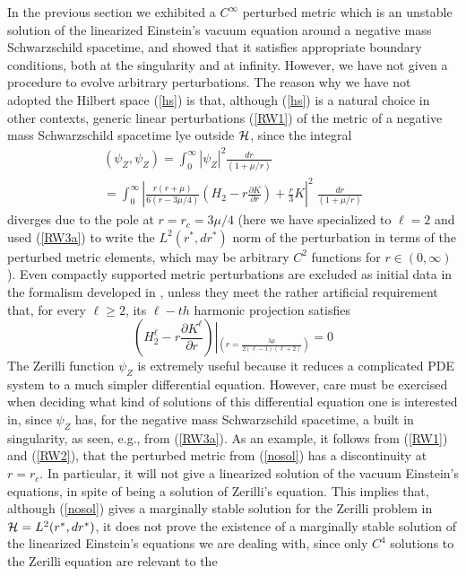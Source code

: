 \documentclass[12pt,aps,floats,showpacs,amssymb,tightenlines]{revtex4}
\newcommand{\m}{\mu}
\newcommand{\s}{ Schwarzschild }
\begin{document}
In the previous section we exhibited a $C^{\infty}$ perturbed metric
which is an unstable solution of the linearized Einstein's vacuum
equation around a negative mass \s spacetime, and showed that it
satisfies appropriate boundary conditions, both at the singularity
and at infinity. However, we have not  given a procedure to evolve
arbitrary perturbations. The reason why we have not adopted the
Hilbert space (\ref{hs}) is that, although (\ref{hs}) is a
natural choice in other contexts, generic linear perturbations
(\ref{RW1}) of the metric of a negative mass \s spacetime lye
outside ${\cal H}$, since the integral
\begin{multline}
(\psi_Z,\psi_Z) = \int _{0}^{\infty} |\psi_Z|^2 \frac{dr}{(1+\m/r)}
\\ = \int _{0}^{\infty} \left| \frac {r (r+\m)}{ 6  ( r - 3\m /4 ) }
\left(H_2
 - r  \frac {\partial K}{\partial r}
\right)
    +\frac{r}{3} K \right|^2 \; \frac{dr}{(1+\m/r)}
\end{multline}
diverges due to the pole at $r= r_c = 3 \mu /4$ (here we have
specialized to $\ell=2$ and used (\ref{RW3a}) to write the
$L^2(r^*,dr^*)$ norm of the perturbation in terms of the perturbed
metric elements, which may be arbitrary  $C^2$ functions for $r \in
(0,\infty)$).  Even compactly supported metric perturbations are
excluded as initial data in the formalism developed in \cite{ghi},
unless they meet the rather artificial requirement that, for every
$\ell \geq 2$, its $\ell-th$ harmonic projection satisfies
$$  \left(H_2^{\ell}
 - r  \frac {\partial K^{\ell}}{\partial r}
\right) \left|_{\left(r = \frac{3 \mu }{2 (\ell-1) (\ell+2)}\right)}
\right. = 0
$$ The Zerilli function $\psi_Z$ is extremely useful because it
reduces a complicated PDE system to a much simpler differential
equation. However, care must be exercised when deciding what kind of
solutions of this differential equation one is interested in, since
$\psi_Z$ has, for the negative mass \s spacetime, a built in
singularity, as seen, e.g., from (\ref{RW3a}). As an example, it
follows from (\ref{RW1}) and (\ref{RW2}), that the perturbed metric
from (\ref{nosol}) has a discontinuity  at $r=r_c$. In particular,
it will not give a linearized solution of the vacuum Einstein's
equations, in spite of being a solution of Zerilli's equation. This
implies that, although (\ref{nosol}) gives a marginally stable
solution for the Zerilli problem in ${\cal H} = L^2(r^*,dr^*)$, it
does not prove the existence of a  marginally stable solution of the
linearized Einstein's equations we are dealing with, since only
$C^4$ solutions to the Zerilli equation are relevant to the
\end{document}
